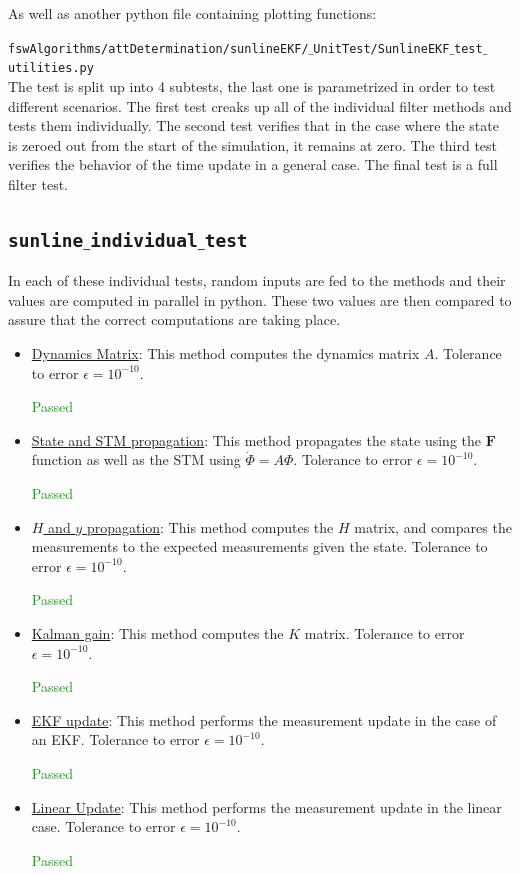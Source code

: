 \documentclass[]{BasiliskReportMemo}
\begin{document}
As well as another python file containing plotting functions:

\noindent
{\tt fswAlgorithms/attDetermination/sunlineEKF/$\_$UnitTest/SunlineEKF$\_$test$\_$utilities.py} \\

The test is split up into 4 subtests, the last one is parametrized in order to test different scenarios. The first test creaks up all of the individual filter methods and tests them individually. The second test verifies that in the case where the state is zeroed out from the start of the simulation, it remains at zero. The third test verifies the behavior of the time update in a general case. The final test is a full filter test.

\subsection{\texttt{sunline$\_$individual$\_$test}}

In each of these individual tests, random inputs are fed to the methods and their values are computed in parallel in python. These two values are then compared to assure that the correct computations are taking place. 
\begin{itemize}
\item \underline{Dynamics Matrix}: This method computes the dynamics matrix $A$. Tolerance to error $\epsilon = 10^{-10}$.

\textcolor{ForestGreen}{Passed}
\item \underline{State and STM propagation}: This method propagates the state using the $\bm F$ function as well as the STM using $\dot{\Phi} = A \Phi$. Tolerance to error $\epsilon = 10^{-10}$.

\textcolor{ForestGreen}{Passed}
\item \underline{$H$ and $y$ propagation}: This method computes the $H$ matrix, and compares the measurements to the expected measurements given the state. Tolerance to error $\epsilon = 10^{-10}$.

\textcolor{ForestGreen}{Passed}
\item \underline{Kalman gain}: This method computes the $K$ matrix. Tolerance to error $\epsilon = 10^{-10}$.

\textcolor{ForestGreen}{Passed}
\item \underline{EKF update}: This method performs the measurement update in the case of an EKF. Tolerance to error $\epsilon = 10^{-10}$.

\textcolor{ForestGreen}{Passed}
\item \underline{Linear Update}: This method performs the measurement update in the linear case. Tolerance to error $\epsilon = 10^{-10}$.

\textcolor{ForestGreen}{Passed}
\end{itemize}
\end{document}
